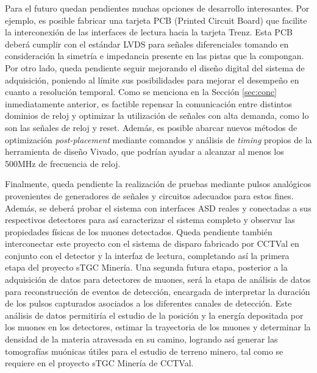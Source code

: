 Para el futuro quedan pendientes muchas opciones de desarrollo interesantes. Por ejemplo, es posible fabricar una tarjeta PCB (Printed Circuit Board) que facilite la interconexión de las interfaces de lectura hacia la tarjeta Trenz. Esta PCB deberá cumplir con el estándar LVDS para señales diferenciales tomando en consideración la simetría e impedancia presente en las pistas que la compongan. Por otro lado, queda pendiente seguir mejorando el diseño digital del sistema de adquisición, poniendo al límite sus posibilidades para mejorar el desempeño en cuanto a resolución temporal. Como se menciona en la Sección \ref{sec:conc} inmediatamente anterior, es factible repensar la comunicación entre distintos dominios de reloj y optimizar la utilización de señales con alta demanda, como lo son las señales de reloj y reset. Además, es posible abarcar nuevos métodos de optimización \textit{post-placement} mediante comandos y análisis de \textit{timing}\cite{XilinxUltraFastGuide} propios de la herramienta de diseño Vivado, que podrían ayudar a alcanzar al menos los 500MHz de frecuencia de reloj.

Finalmente, queda pendiente la realización de pruebas mediante pulsos analógicos provenientes de generadores de señales y circuitos adecuados para estos fines. Además, se deberá probar el sistema con interfaces ASD reales y conectadas a sus respectivos detectores para así caracterizar el sistema completo y observar las propiedades físicas de los muones detectados. Queda pendiente también interconectar este proyecto con el sistema de disparo\cite{Oyanadel2020SistemaSTGC} fabricado por CCTVal en conjunto con el detector y la interfaz de lectura, completando así la primera etapa del proyecto sTGC Minería. Una segunda futura etapa, posterior a la adquisición de datos para detectores de muones, será la etapa de análisis de datos para reconstrucción de eventos de detección, encargada de interpretar la duración de los pulsos capturados asociados a los diferentes canales de detección. Este análisis de datos permitiría el estudio de la posición y la energía depositada por los muones en los detectores, estimar la trayectoria de los muones y determinar la densidad de la materia atravesada en su camino, logrando así generar las tomografías muónicas útiles para el estudio de terreno minero, tal como se requiere en el proyecto sTGC Minería de CCTVal.
